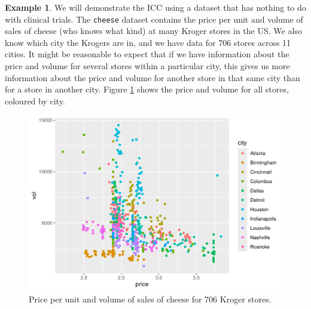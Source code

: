 \documentclass[
  openany]{book}
\newenvironment{Shaded}{\begin{snugshade}}{\end{snugshade}}
\newcommand{\AttributeTok}[1]{\textcolor[rgb]{0.13,0.29,0.53}{#1}}
\newcommand{\FunctionTok}[1]{\textcolor[rgb]{0.13,0.29,0.53}{\textbf{#1}}}
\newcommand{\NormalTok}[1]{#1}
\newcommand{\OtherTok}[1]{\textcolor[rgb]{0.56,0.35,0.01}{#1}}
\newcommand{\SpecialCharTok}[1]{\textcolor[rgb]{0.81,0.36,0.00}{\textbf{#1}}}
\newcommand{\StringTok}[1]{\textcolor[rgb]{0.31,0.60,0.02}{#1}}
\theoremstyle{definition}
\theoremstyle{definition}
\newtheorem{example}{Example}[chapter]
\theoremstyle{definition}
\theoremstyle{definition}
\theoremstyle{remark}
\begin{document}
\begin{example}
\protect\hypertarget{exm:kroger}{}\label{exm:kroger}We will demonstrate the ICC using a dataset that has nothing to do with clinical trials. The \texttt{cheese} dataset contains the price per unit and volume of sales of cheese (who knows what kind) at many Kroger stores in the US. We also know which city the Krogers are in, and we have data for 706 stores across 11 cities. It might be reasonable to expect that if we have information about the price and volume for several stores within a particular city, this gives us more information about the price and volume for another store in that same city than for a store in another city. Figure \ref{fig:cheesedata} shows the price and volume for all stores, coloured by city.

\begin{Shaded}
\end{Shaded}

\begin{figure}
\centering
\includegraphics{CT4H_notes_files/figure-latex/cheesedata-1.pdf}
\caption{\label{fig:cheesedata}Price per unit and volume of sales of cheese for 706 Kroger stores.}
\end{figure}


\end{example}
\end{document}
